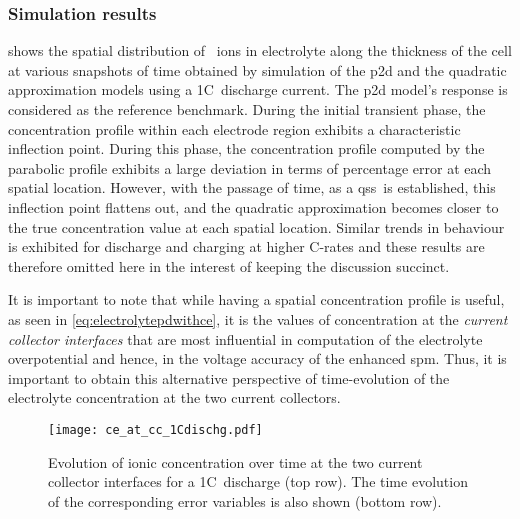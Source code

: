\subsubsection*{Simulation results}\label{subsubsec:simresultsbaselinequad}

 shows  the spatial distribution of  ~ions
in electrolyte  along the  thickness of  the cell at  various snapshots  of time
obtained by simulation  of the \gls{p2d} and the  quadratic approximation models
using a  1C~discharge current. The  \gls{p2d} model's response is  considered as
the reference benchmark.  During the initial transient  phase, the concentration
profile within each electrode region exhibits a characteristic inflection point.
During this phase,  the concentration profile computed by  the parabolic profile
exhibits  a  large deviation  in  terms  of  percentage  error at  each  spatial
location. However, with the passage of time, as a \gls{qss}~is established, this
inflection point flattens out, and the quadratic approximation becomes closer to
the  true  concentration value  at  each  spatial  location. Similar  trends  in
behaviour is  exhibited for discharge and  charging at higher C-rates  and these
results are  therefore omitted here  in the  interest of keeping  the discussion
succinct.

It  is important  to  note that  while having  a  spatial concentration  profile
is  useful,  as  seen  in \cref{eq:electrolytepdwithce}, it  is  the  values  of
concentration  at   the  \emph{current  collector  interfaces}   that  are  most
influential in  computation of the  electrolyte overpotential and hence,  in the
voltage accuracy of the enhanced \gls{spm}. Thus, it is important to obtain this
alternative perspective  of time-evolution  of the electrolyte  concentration at
the two current collectors.

\begin{figure}[!htbp]
    \centering
    \texttt{[image: ce\_at\_cc\_1Cdischg.pdf]}
    \caption[Ionic concentrations at current collector
    interfaces over time for 1C~discharge]{Evolution of ionic concentration over
        time at the two current collector interfaces for a 1C~discharge (top
        row). The time evolution of the corresponding error variables is also
    shown (bottom row).}
    \label{fig:temporalcequadratic}
\end{figure}

